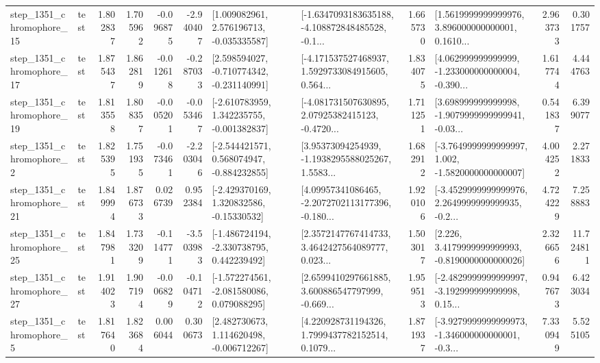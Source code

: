\begin{tabular}{llrrrrllrlrr}
 step\_1351\_chromophore\_15 &      test &      1.802837 &    1.705962 &     -0.096875 & -2.940407 &    [1.009082961, 2.576196713, -0.035335587] &  [-1.6347093183635188, -4.108872848485528, -0.1... &       1.665730 &  [1.5619999999999976, 3.896000000000001, 0.1610... &            2.963733 &          0.301757 \\
 step\_1351\_chromophore\_17 &      test &      1.875437 &    1.862819 &     -0.012618 & -0.287033 &   [2.598594027, -0.710774342, -0.231140991] &  [-4.171537527468937, 1.5929733084915605, 0.564... &       1.834075 &  [4.062999999999999, -1.233000000000004, -0.390... &            1.617744 &          4.444763 \\
 step\_1351\_chromophore\_19 &      test &      1.813558 &    1.808357 &     -0.005201 & -0.053467 &   [-2.610783959, 1.342235755, -0.001382837] &  [-4.081731507630895, 2.07925382415123, -0.4720... &       1.711251 &  [3.698999999999998, -1.9079999999999941, -0.03... &            0.541837 &          6.399077 \\
  step\_1351\_chromophore\_2 &      test &      1.825395 &    1.751935 &     -0.073461 & -2.203046 &   [-2.544421571, 0.568074947, -0.884232855] &  [3.95373094254939, -1.1938295588025267, 1.5583... &       1.682912 &  [-3.7649999999999997, 1.002, -1.5820000000000007] &            4.004252 &          2.271833 \\
 step\_1351\_chromophore\_21 &      test &      1.849994 &    1.876733 &      0.026739 &  0.952384 &    [-2.429370169, 1.320832586, -0.15330532] &  [4.09957341086465, -2.2072702113177396, -0.180... &       1.920106 &  [-3.4529999999999976, 2.2649999999999935, -0.2... &            4.724229 &          7.258883 \\
 step\_1351\_chromophore\_25 &      test &      1.847981 &    1.733209 &     -0.114771 & -3.503983 &   [-1.486724194, -2.330738795, 0.442239492] &  [2.3572147767414733, 3.4642427564089777, 0.023... &       1.503017 &   [2.226, 3.4179999999999993, -0.8190000000000026] &            2.326656 &         11.724811 \\
 step\_1351\_chromophore\_27 &      test &      1.914023 &    1.907194 &     -0.006829 & -0.104712 &   [-1.572274561, -2.081580086, 0.079088295] &  [2.6599410297661885, 3.600886547797999, -0.669... &       1.959513 &  [-2.4829999999999997, -3.192999999999998, 0.15... &            0.947673 &          6.423034 \\
  step\_1351\_chromophore\_5 &      test &      1.817640 &    1.823684 &      0.006044 &  0.300673 &    [2.482730673, 1.114620498, -0.006712267] &  [4.220928731194326, 1.7999437782152514, 0.1079... &       1.871937 &  [-3.9279999999999973, -1.346000000000001, -0.3... &            7.330949 &          5.525105 \\

\end{tabular}

